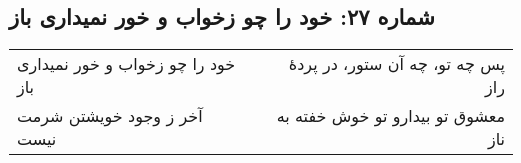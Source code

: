 \begin{center}
\section*{شماره ۲۷: خود را چو زخواب و خور نمیداری باز}
\label{sec:027}
\begin{longtable}{l p{0.5cm} r}
خود را چو زخواب و خور نمیداری باز
&&
پس چه تو، چه آن ستور، در پردهٔ راز
\\
آخر ز وجود خویشتن شرمت نیست
&&
معشوق تو بیدارو تو خوش خفته به ناز
\\
\end{longtable}
\end{center}
